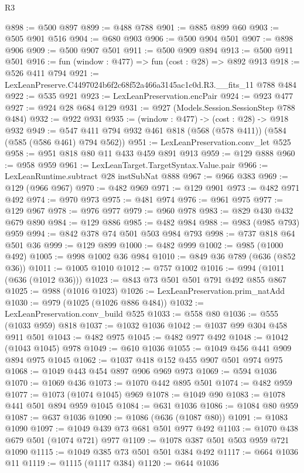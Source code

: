 \begin{lexlean}{R3}
\begin{coremodule}
@898 := @500 @897
@899 := @488 @788
@901 := @885 @899 @60
@903 := @505 @901 @516
@904 := @680 @903
@906 := @500 @904 @501
@907 := @898 @906
@909 := @500 @907 @501
@911 := @500 @909 @894
@913 := @500 @911 @501
@916 := fun (window : @477) => fun (cost : @28) => @892 @913
@918 := @526 @411 @794
@921 := LexLeanPreserve.C4497024b6f2c68f52a466a3145ac1c0d.R3.__fits_11 @788 @484
@922 := @535 @921
@923 := LexLeanPreservation.encPair
@924 := @923 @477
@927 := @924 @28 @684 @129
@931 := @927 (Models.Session.SessionStep @788 @484)
@932 := @922 @931
@935 := (window : @477) -> (cost : @28) -> @918 @932
@949 := @547 @411 @794 @932 @461 @818 (@568 (@578 @411)) (@584 (@585 (@586 @461) @794 @562))
@951 := LexLeanPreservation.conv_let @525
@958 := @951 @818 @80 @11 @433 @459 @891 @913
@959 := @129 @888
@960 := @958 @959
@961 := LexLeanTarget.TargetSyntax.Value.pair
@966 := LexLeanRuntime.subtract @28 instSubNat @888
@967 := @966 @383
@969 := @129 (@966 @967)
@970 := @482 @969
@971 := @129 @901
@973 := @482 @971 @492
@974 := @970 @973
@975 := @481 @974
@976 := @961 @975
@977 := @129 @967
@978 := @976 @977
@979 := @960 @978
@983 := @829 @430 @432 @679 @890
@984 := @129 @886
@985 := @482 @984
@988 := @983 (@985 @793) @959
@994 := @842 @378 @74 @501 @503 @984 @793
@998 := @737 @818 @64 @501 @36
@999 := @129 @899
@1000 := @482 @999
@1002 := @985 (@1000 @492)
@1005 := @998 @1002 @36 @984
@1010 := @849 @36 @789 (@636 (@852 @36))
@1011 := @1005 @1010
@1012 := @757 @1002
@1016 := @994 (@1011 (@636 (@1012 @36)))
@1023 := @843 @73 @501 @501 @791 @492 @855 @867
@1025 := @988 (@1016 @1023)
@1026 := LexLeanPreservation.prim_natAdd
@1030 := @979 (@1025 (@1026 @886 @484))
@1032 := LexLeanPreservation.conv_build @525
@1033 := @558 @80
@1036 := @555 (@1033 @959) @818
@1037 := @1032 @1036
@1042 := @1037 @99 @304 @458 @911 @501
@1043 := @482 @975
@1045 := @482 @977 @492
@1048 := @1042 (@1043 @1045) @978
@1049 := @610 @1036
@1055 := @1049 @456 @441 @909 @894 @975 @1045
@1062 := @1037 @418 @152 @455 @907 @501 @974 @975
@1068 := @1049 @443 @454 @897 @906 @969 @973
@1069 := @594 @1036
@1070 := @1069 @436
@1073 := @1070 @442 @895 @501
@1074 := @482 @959
@1077 := @1073 (@1074 @1045) @969
@1078 := @1049 @90
@1083 := @1078 @441 @501 @894 @959 @1045
@1084 := @631 @1036
@1086 := @1084 @80 @959
@1087 := @637 @1036
@1090 := @1086 (@636 (@1087 @80))
@1091 := @1083 @1090
@1097 := @1049 @439 @73 @681 @501 @977 @492
@1103 := @1070 @438 @679 @501 (@1074 @721) @977
@1109 := @1078 @387 @501 @503 @959 @721 @1090
@1115 := @1049 @385 @73 @501 @501 @384 @492
@1117 := @664 @1036 @11
@1119 := @1115 (@1117 @384)
@1120 := @644 @1036

\end{coremodule}
\end{lexlean}
